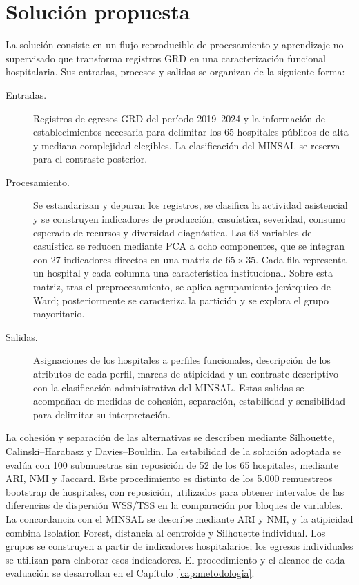 \section{Solución propuesta}
\label{sec:solucion}

La solución consiste en un flujo reproducible de procesamiento y aprendizaje
no supervisado que transforma registros GRD en una caracterización funcional
hospitalaria. Sus entradas, procesos y salidas se organizan de la siguiente
forma:

\begin{description}
  \item[Entradas.] Registros de egresos GRD del período 2019--2024 y la
    información de establecimientos necesaria para delimitar los 65 hospitales
    públicos de alta y mediana complejidad elegibles. La clasificación del
    MINSAL se reserva para el contraste posterior.
  \item[Procesamiento.] Se estandarizan y depuran los registros, se clasifica
    la actividad asistencial y se construyen indicadores de producción,
    casuística, severidad, consumo esperado de recursos y diversidad
    diagnóstica. Las 63 variables de casuística se reducen mediante PCA a ocho
    componentes, que se integran con 27 indicadores directos en una matriz de
    $65\times35$. Cada fila representa un hospital y cada columna una
    característica institucional. Sobre esta matriz, tras el preprocesamiento,
    se aplica agrupamiento jerárquico de Ward; posteriormente se caracteriza
    la partición y se explora el grupo mayoritario.
  \item[Salidas.] Asignaciones de los hospitales a perfiles funcionales,
    descripción de los atributos de cada perfil, marcas de atipicidad y un
    contraste descriptivo con la clasificación administrativa del MINSAL.
    Estas salidas se acompañan de medidas de cohesión, separación,
    estabilidad y sensibilidad para delimitar su interpretación.
\end{description}

La cohesión y separación de las alternativas se describen mediante Silhouette,
Calinski--Harabasz y Davies--Bouldin. La estabilidad de la solución adoptada se
evalúa con 100 submuestras sin reposición de 52 de los 65 hospitales, mediante
ARI, NMI y Jaccard. Este procedimiento es distinto de los 5.000 remuestreos
bootstrap de hospitales, con reposición, utilizados para obtener intervalos de
las diferencias de dispersión WSS/TSS en la comparación por bloques de
variables. La concordancia con el MINSAL se describe mediante ARI y NMI, y la
atipicidad combina Isolation Forest, distancia al centroide y Silhouette
individual. Los grupos se construyen a partir de indicadores hospitalarios;
los egresos individuales se utilizan para elaborar esos indicadores.
El procedimiento y el alcance de cada evaluación se desarrollan en el
Capítulo~\ref{cap:metodologia}.

